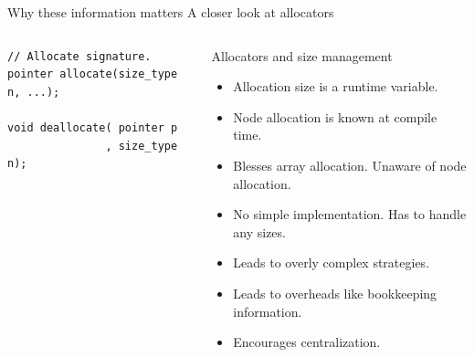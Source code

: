 \documentclass[10pt,aspectratio=169]{beamer}
\begin{document}
\begin{frame}[fragile]
{Why these information matters}
{A closer look at allocators}
\begin{columns}
\begin{column}{0.35\textwidth}

\begin{lstlisting}
// Allocate signature.
pointer allocate(size_type n, ...);

void deallocate( pointer p
               , size_type n);
\end{lstlisting}

\end{column}

\begin{column}{0.55\textwidth}
\begin{block} {Allocators and size management}
\begin{itemize}
\item Allocation size is a runtime variable.
\item Node allocation is known at compile time.
\item Blesses array allocation. Unaware of node allocation.
\item No simple implementation. Has to handle any sizes.
\item Leads to overly complex strategies.
\item Leads to overheads like bookkeeping information.
\item Encourages centralization.
\end{itemize}

\end{block}

\end{column}
\end{columns}
\end{frame}
\end{document}
